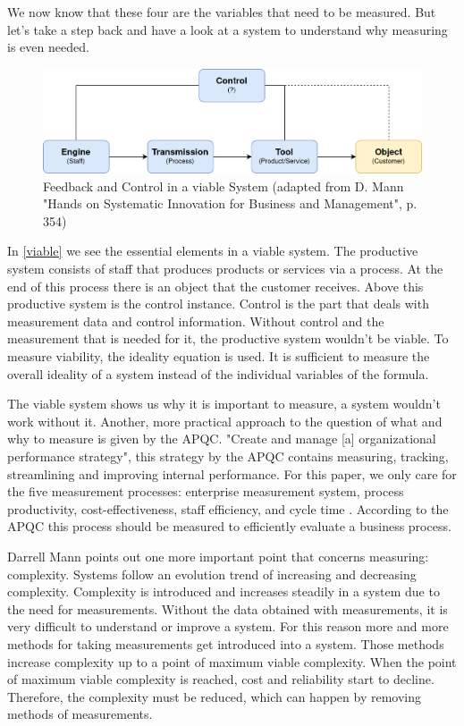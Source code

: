We now know that these four are the variables that need to be measured.
But let's take a step back and have a look at a system to understand why measuring is even needed.

\begin{figure}[h]
	\centering
	\includegraphics[width=\textwidth]{control3.png}
	\caption{Feedback and Control in a viable System (adapted from D. Mann "Hands on Systematic Innovation for Business and Management", p. 354)}
	\label{viable}
\end{figure}

In \autoref{viable} we see the essential elements in a viable system.
The productive system consists of staff that produces products or services via a process.
At the end of this process there is an object that the customer receives.
Above this productive system is the control instance.
Control is the part that deals with measurement data and control information.
Without control and the measurement that is needed for it, the productive system wouldn't be viable.
To measure viability, the ideality equation is used.
It is sufficient to measure the overall ideality of a system instead of the individual variables of the formula.

The viable system shows us why it is important to measure, a system wouldn't work without it.
Another, more practical approach to the question of what and why to measure is given by the APQC.
"Create and manage [a] organizational performance strategy", this strategy by the APQC contains measuring, tracking, streamlining and improving internal performance.
For this paper, we only care for the five measurement processes: enterprise measurement system, process productivity, cost-effectiveness, staff efficiency, and cycle time \cite{apqc}.
According to the APQC this process should be measured to efficiently evaluate a business process.

Darrell Mann points out one more important point that concerns measuring: complexity.
Systems follow an evolution trend of increasing and decreasing complexity.
Complexity is introduced and increases steadily in a system due to the need for measurements.
Without the data obtained with measurements, it is very difficult to understand or improve a system.
For this reason more and more methods for taking measurements get introduced into a system.
Those methods increase complexity up to a point of maximum viable complexity.
When the point of maximum viable complexity is reached, cost and reliability start to decline.
Therefore, the complexity must be reduced, which can happen by removing methods of measurements.

